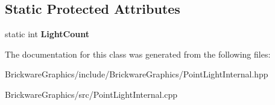 \subsection*{Static Protected Attributes}
\begin{DoxyCompactItemize}
\item 
\hypertarget{classBrickware_1_1Graphics_1_1PointLightInternal_a19c8db3173648ac3a346882915f8f6ae}{}static int {\bfseries Light\+Count}\label{classBrickware_1_1Graphics_1_1PointLightInternal_a19c8db3173648ac3a346882915f8f6ae}

\end{DoxyCompactItemize}


The documentation for this class was generated from the following files\+:\begin{DoxyCompactItemize}
\item 
Brickware\+Graphics/include/\+Brickware\+Graphics/Point\+Light\+Internal.\+hpp\item 
Brickware\+Graphics/src/Point\+Light\+Internal.\+cpp\end{DoxyCompactItemize}
